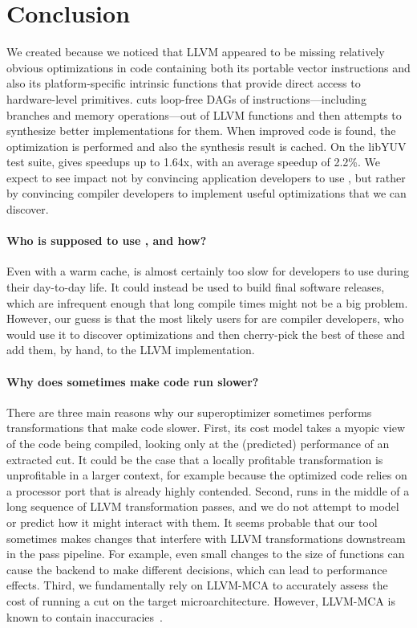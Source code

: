 \section{Conclusion}
\label{sec:conc}

We created \tool{} because we noticed that LLVM appeared to be missing
relatively obvious optimizations in code containing both its portable
vector instructions and also its platform-specific intrinsic
functions that provide direct access to hardware-level primitives.
%
\tool{} cuts loop-free DAGs of instructions---including branches and
memory operations---out of LLVM functions and then attempts to
synthesize better implementations for them.
%
When improved code is found, the optimization is performed and also
the synthesis result is cached.
%
On the libYUV test suite, \tool{} gives speedups up to 1.64x,
with an average speedup of 2.2\%.
%
We expect to see impact not by convincing application developers to
use \tool, but rather by convincing compiler developers to implement
useful optimizations that we can discover.




\iffalse
\paragraph{Who is supposed to use \tool{}, and how?}
%
Even with a warm cache, \tool{} is almost certainly too slow for
developers to use during their day-to-day life.
%
It could instead be used to build final software releases, which are
infrequent enough that long compile times might not be a big problem.
%
However, our guess is that the most likely users for \tool{} are
compiler developers, who would use it to discover optimizations and
then cherry-pick the best of these and add them, by hand, to the LLVM
implementation.


\paragraph{Why does \tool{} sometimes make code run slower?}
%
There are three main reasons why our
superoptimizer sometimes performs transformations that make code
slower.
%
First, its cost model takes a myopic view of the code being compiled,
looking only at the (predicted) performance of an extracted cut.
%
It could be the case that a locally profitable transformation is
unprofitable in a larger context, for example because the optimized
code relies on a processor port that is already highly contended.
%
Second, \tool{} runs in the middle of a long sequence of LLVM
transformation passes, and we do not attempt to model or predict how it
might interact with them.
%
It seems probable that our tool sometimes makes changes that interfere
with LLVM transformations downstream in the pass pipeline.
%
For example, even small changes to the size of functions can cause the
backend to make different decisions, which can lead to performance effects.
%
Third, we fundamentally rely on LLVM-MCA to accurately assess the cost
of running a cut on the target microarchitecture.
%
However, LLVM-MCA is known to contain inaccuracies~\cite{ithemal}.


